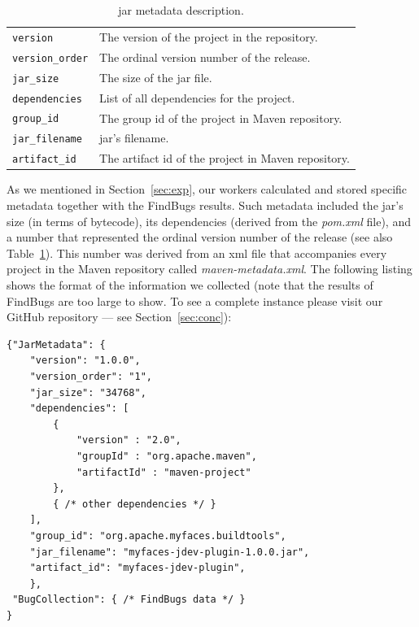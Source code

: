 \documentclass{sig-alternate}
\begin{document}
\begin{table}[b]
\centering
\begin{tabular}{l p{5.0cm}}
 \hline
\verb|version| & The version of the project in the repository. \\
\verb|version_order| & The ordinal version number of the release. \\
\verb|jar_size| & The size of the {\sc jar} file. \\
\verb|dependencies| & List of all dependencies for the project. \\
\verb|group_id| & The group {\sc id} of the project in Maven repository. \\
\verb|jar_filename| & {\sc jar}'s filename. \\
\verb|artifact_id| & The artifact {\sc id} of the project in Maven repository. \\
 \hline
 \end{tabular}
\caption{{\sc jar} metadata description.}
\label{tbl:metadata-description}
\end{table}

As we mentioned in Section~\ref{sec:exp}, our
workers calculated and stored specific metadata together
with the FindBugs results.
Such metadata included the {\sc jar}'s size (in terms of bytecode),
its dependencies
(derived from the {\it pom.xml} file),
and a number that represented the ordinal version
number of the release (see also
Table~\ref{tbl:metadata-description}).
This number was derived from an {\sc xml}
file that accompanies every project in the Maven repository
called {\it maven-metadata.xml}.
The following listing shows the format of the
information we collected (note
that the results of FindBugs are too large to
show. To see a complete instance please visit our
GitHub repository --- see Section~\ref{sec:conc}):
 
\begin{verbatim}
{"JarMetadata": {
    "version": "1.0.0",
    "version_order": "1",
    "jar_size": "34768",
    "dependencies": [
        {
            "version" : "2.0",
            "groupId" : "org.apache.maven",
            "artifactId" : "maven-project"
        },
        { /* other dependencies */ }
    ],
    "group_id": "org.apache.myfaces.buildtools",
    "jar_filename": "myfaces-jdev-plugin-1.0.0.jar",
    "artifact_id": "myfaces-jdev-plugin",
    }, 
 "BugCollection": { /* FindBugs data */ }
}
\end{verbatim}
\end{document}
